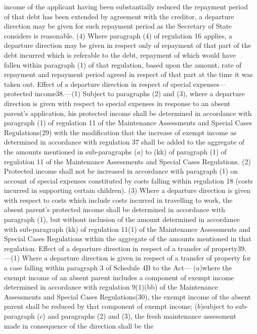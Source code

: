 \documentclass[a4paper]{article}
\begin{document}
income of the applicant having been substantially reduced the repayment period
of that debt has been extended by agreement with the creditor, a departure
direction may be given for such repayment period as the Secretary of State
considers is reasonable.
(4) Where paragraph (4) of regulation 16 applies, a departure direction may be
given in respect only of repayment of that part of the debt incurred which is
referable to the debt, repayment of which would have fallen within paragraph (1)
of that regulation, based upon the amount, rate of repayment and repayment
period agreed in respect of that part at the time it was taken out.
Effect of a departure direction in respect of special expenses—protected
income38.—(1) Subject to paragraphs (2) and (3), where a departure direction is
given with respect to special expenses in response to an absent parent’s
application, his protected income shall be determined in accordance with
paragraph (1) of regulation 11 of the Maintenance Assessments and Special Cases
Regulations(29) with the modification that the increase of exempt income as
determined in accordance with regulation 37 shall be added to the aggregate of
the amounts mentioned in sub-paragraphs ($a$) to (kk) of paragraph (1) of
regulation 11 of the Maintenance Assessments and Special Cases Regulations.
(2) Protected income shall not be increased in accordance with paragraph (1) on
account of special expenses constituted by costs falling within regulation 18
(costs incurred in supporting certain children).
(3) Where a departure direction is given with respect to costs which include
costs incurred in travelling to work, the absent parent’s protected income shall
be determined in accordance with paragraph (1), but without inclusion of the
amount determined in accordance with sub-paragraph (kk) of regulation 11(1) of
the Maintenance Assessments and Special Cases Regulations within the aggregate
of the amounts mentioned in that regulation.
Effect of a departure direction in respect of a transfer of property39.—(1)
Where a departure direction is given in respect of a transfer of property for a
case falling within paragraph 3 of Schedule 4B to the Act—
($a$)where the exempt income of an absent parent includes a component of exempt
income determined in accordance with regulation 9(1)(bb) of the Maintenance
Assessments and Special Cases Regulations(30), the exempt income of the absent
parent shall be reduced by that component of exempt income;
($b$)subject to sub-paragraph ($c$) and paragraphs (2) and (3), the fresh
maintenance assessment made in consequence of the direction shall be the
\end{document}
